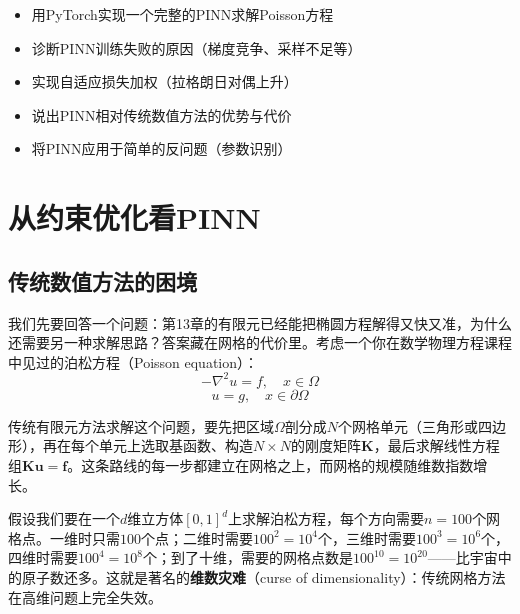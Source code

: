 \begin{tcolorbox}[colback=green!5, colframe=green!60!black, title=学完这章，你将能够...]
\begin{itemize}
    \item 用PyTorch实现一个完整的PINN求解Poisson方程
    \item 诊断PINN训练失败的原因（梯度竞争、采样不足等）
    \item 实现自适应损失加权（拉格朗日对偶上升）
    \item 说出PINN相对传统数值方法的优势与代价
    \item 将PINN应用于简单的反问题（参数识别）
\end{itemize}
\end{tcolorbox}

\section{从约束优化看PINN}

\subsection{传统数值方法的困境}

我们先要回答一个问题：第13章的有限元已经能把椭圆方程解得又快又准，为什么还需要另一种求解思路？答案藏在网格的代价里。考虑一个你在数学物理方程课程中见过的泊松方程（Poisson equation）：
\begin{equation}
    -\nabla^2 u = f, \quad x \in \Omega
\end{equation}
\begin{equation}
    u = g, \quad x \in \partial\Omega
\end{equation}

传统有限元方法求解这个问题，要先把区域$\Omega$剖分成$N$个网格单元（三角形或四边形），再在每个单元上选取基函数、构造$N \times N$的刚度矩阵$\mathbf{K}$，最后求解线性方程组$\mathbf{K}\mathbf{u} = \mathbf{f}$。这条路线的每一步都建立在网格之上，而网格的规模随维数指数增长。

\begin{example}[维数灾难]
假设我们要在一个$d$维立方体$[0,1]^d$上求解泊松方程，每个方向需要$n=100$个网格点。一维时只需$100$个点；二维时需要$100^2 = 10^4$个，三维时需要$100^3 = 10^6$个，四维时需要$100^4 = 10^8$个；到了十维，需要的网格点数是$100^{10} = 10^{20}$——比宇宙中的原子数还多。这就是著名的\textbf{维数灾难}（curse of dimensionality）：传统网格方法在高维问题上完全失效。
\end{example}

